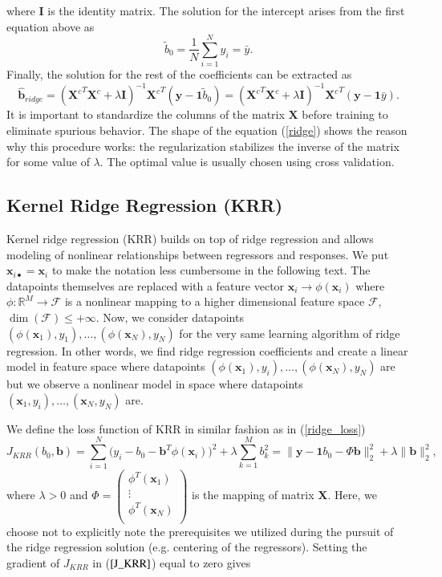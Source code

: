 \documentclass[11pt,oneside,czech,american]{book} %
\theoremstyle{plain}
\theoremstyle{definition}
\begin{document}
where $\bm{I}$ is the identity matrix. The solution for the intercept arises from the first equation above as
\begin{equation}
	\tilde{b}_0 = \frac{1}{N} \sum_{i=1}^{N} y_i = \bar{y}.
	\label{b_0_ridge}
\end{equation}
Finally, the solution for the rest of the coefficients can be extracted as
\begin{equation}
	\bm{\hat{b}}_{ridge} = ({\bm{X}^{c}}^{T} {\bm{X}^{c}} + \lambda \bm{I})^{-1} {\bm{X}^{c}}^{T} (\bm{y} - \bm{1} \tilde{b}_0) = ({\bm{X}^{c}}^{T} {\bm{X}^{c}} + \lambda \bm{I})^{-1} {\bm{X}^{c}}^{T} (\bm{y} - \bm{1} \bar{y}).
	\label{ridge}
\end{equation}
It is important to standardize the columns of the matrix $\bm{X}$ before training to eliminate spurious behavior. The shape of the equation (\ref{ridge}) shows the reason why this procedure works: the regularization stabilizes the inverse of the matrix for some value of $\lambda$. The optimal value is usually chosen using cross validation.

\subsection{Kernel Ridge Regression (KRR)}
Kernel ridge regression (KRR) builds on top of ridge regression and allows modeling of nonlinear relationships between regressors and responses. We put $\bm{x}_{i \bullet} = \bm{x}_i$ to make the notation less cumbersome in the following text. The datapoints themselves are replaced with a feature vector $\bm{x}_i \rightarrow \phi(\bm{x}_i) $ where $\phi: \mathbb{R}^{M} \rightarrow \mathcal{F}$ is a nonlinear mapping to a higher dimensional feature space $\mathcal{F}$, $\dim(\mathcal{F}) \leq +\infty$. Now, we consider datapoints $(\phi(\bm{x}_1),y_1), \dots , (\phi(\bm{x}_N), y_N)$ for the very same learning algorithm of ridge regression. In other words, we find ridge regression coefficients and create a linear model in feature space where datapoints $(\phi(\bm{x}_1),y_i), \dots , (\phi(\bm{x}_N), y_N)$ are but we observe a nonlinear model in space where datapoints $(\bm{x}_1,y_i), \dots , (\bm{x}_N, y_N)$ are.

We define the loss function of KRR in similar fashion as in (\ref{ridge_loss})
\begin{equation}
	J_{KRR}(b_0, \bm{b}) = \sum_{i=1}^{N}\Big( y_i - b_0 -\bm{b}^T \phi(\bm{x}_i) \Big)^2 + \lambda \sum_{k=1}^{M} b_k^2 = \| \bm{y} - \bm{1}b_0 -\Phi \bm{b} \|^2_2 + \lambda \| \bm{b} \|^2_2,
	\label{J_KRR}
\end{equation}
where $\lambda >0$ and $\Phi = \begin{pmatrix}
	\phi^T (\bm{x}_1) \\
	\vdots \\
	\phi^T (\bm{x}_N) \\
\end{pmatrix}$ is the mapping of matrix $\bm{X}$. Here, we choose not to explicitly note the prerequisites we utilized during the pursuit of the ridge regression solution (e.g. centering of the regressors). Setting the gradient of $J_{KRR}$ in ($\ref{J_KRR}$) equal to zero gives
\end{document}
